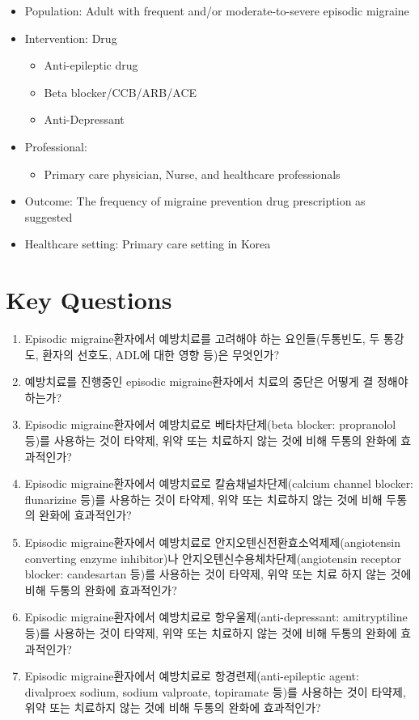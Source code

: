 \documentclass[]{book}
\providecommand{\tightlist}{%
  \setlength{\itemsep}{0pt}\setlength{\parskip}{0pt}}
\begin{document}
\begin{itemize}
\item
  Population: Adult with frequent and/or moderate-to-severe episodic migraine
\item
  Intervention: Drug

  \begin{itemize}
  \tightlist
  \item
    Anti-epileptic drug
  \item
    Beta blocker/CCB/ARB/ACE
  \item
    Anti-Depressant
  \end{itemize}
\item
  Professional:

  \begin{itemize}
  \tightlist
  \item
    Primary care physician, Nurse, and healthcare professionals
  \end{itemize}
\item
  Outcome: The frequency of migraine prevention drug prescription as suggested
\item
  Healthcare setting: Primary care setting in Korea
\end{itemize}

\hypertarget{key-questions}{%
\section*{Key Questions}\label{key-questions}}

\begin{enumerate}
\def\labelenumi{\arabic{enumi}.}
\item
  Episodic migraine환자에서 예방치료를 고려해야 하는 요인들(두통빈도, 두 통강도, 환자의 선호도, ADL에 대한 영향 등)은 무엇인가?
\item
  예방치료를 진행중인 episodic migraine환자에서 치료의 중단은 어떻게 결 정해야 하는가?
\item
  Episodic migraine환자에서 예방치료로 베타차단제(beta blocker: propranolol 등)를 사용하는 것이 타약제, 위약 또는 치료하지 않는 것에 비해 두통의 완화에 효과적인가?
\item
  Episodic migraine환자에서 예방치료로 칼슘채널차단제(calcium channel blocker: flunarizine 등)를 사용하는 것이 타약제, 위약 또는 치료하지 않는 것에 비해 두통의 완화에 효과적인가?
\item
  Episodic migraine환자에서 예방치료로 안지오텐신전환효소억제제(angiotensin converting enzyme inhibitor)나 안지오텐신수용체차단제(angiotensin receptor blocker: candesartan 등)를 사용하는 것이 타약제, 위약 또는 치료 하지 않는 것에 비해 두통의 완화에 효과적인가?
\item
  Episodic migraine환자에서 예방치료로 항우울제(anti-depressant: amitryptiline 등)를 사용하는 것이 타약제, 위약 또는 치료하지 않는 것에 비해 두통의 완화에 효과적인가?
\item
  Episodic migraine환자에서 예방치료로 항경련제(anti-epileptic agent: divalproex sodium, sodium valproate, topiramate 등)를 사용하는 것이 타약제, 위약 또는 치료하지 않는 것에 비해 두통의 완화에 효과적인가?
\end{enumerate}


\end{document}
